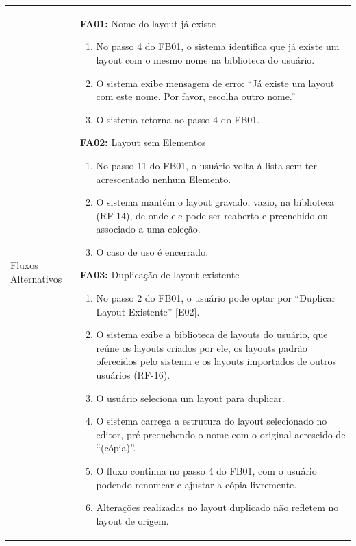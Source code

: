 \begin{longtable}{ >{\raggedright}p{2.8cm} | >{\raggedright\arraybackslash}p{10.7cm} }
Fluxos Alternativos & \mbox{}
\textbf{FA01:} Nome do layout já existe
\vspace{2pt}
\begin{enumerate}[nosep,leftmargin=1.2em,topsep=0pt,partopsep=0pt,parsep=0pt,itemsep=0pt,after=\vspace{2pt}]
	\item No passo 4 do FB01, o sistema identifica que já existe um layout com o mesmo nome na biblioteca do usuário.
	\item O sistema exibe mensagem de erro: ``Já existe um layout com este nome. Por favor, escolha outro nome.''
	\item O sistema retorna ao passo 4 do FB01.
\end{enumerate}

\textbf{FA02:} Layout sem Elementos
\vspace{2pt}
\begin{enumerate}[nosep,leftmargin=1.2em,topsep=0pt,partopsep=0pt,parsep=0pt,itemsep=0pt,after=\vspace{2pt}]
	\item No passo 11 do FB01, o usuário volta à lista sem ter acrescentado nenhum Elemento.
	\item O sistema mantém o layout gravado, vazio, na biblioteca (RF-14), de onde ele pode ser reaberto e preenchido ou associado a uma coleção.
	\item O caso de uso é encerrado.
\end{enumerate}

\textbf{FA03:} Duplicação de layout existente
\vspace{2pt}
\begin{enumerate}[nosep,leftmargin=1.2em,topsep=0pt,partopsep=0pt,parsep=0pt,itemsep=0pt,after=\vspace{2pt}]
	\item No passo 2 do FB01, o usuário pode optar por ``Duplicar Layout Existente'' [E02].
	\item O sistema exibe a biblioteca de layouts do usuário, que reúne os layouts criados por ele, os layouts padrão oferecidos pelo sistema e os layouts importados de outros usuários (RF-16).
	\item O usuário seleciona um layout para duplicar.
	\item O sistema carrega a estrutura do layout selecionado no editor, pré-preenchendo o nome com o original acrescido de ``(cópia)''.
	\item O fluxo continua no passo 4 do FB01, com o usuário podendo renomear e ajustar a cópia livremente.
	\item Alterações realizadas no layout duplicado não refletem no layout de origem.
\end{enumerate}
\mbox{} \\


\end{longtable}
